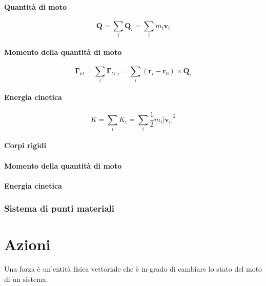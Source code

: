 \subsubsection{Quantità di moto}
\begin{equation}
    \mathbf{Q} = \sum_{i} \mathbf{Q}_i = \sum_i m_i \mathbf{v}_i
\end{equation}
\subsubsection{Momento della quantità di moto}
\begin{equation}
    \mathbf{\Gamma}_O = \sum_{i} \mathbf{\Gamma}_{O,i} = \sum_i \left( \mathbf{r}_i - \mathbf{r}_0 \right) \times \mathbf{Q}_i
\end{equation}
\subsubsection{Energia cinetica}
\begin{equation}
    K = \sum_i K_i = \sum_i \dfrac{1}{2} m_i | \mathbf{v}_i |^2
\end{equation}

\subsubsection{Corpi rigidi}
\subsubsection{Momento della quantità di moto}
\subsubsection{Energia cinetica}

\subsection{Sistema di punti materiali}

\chapter{Azioni}
\begin{definition}[Forza] Una forza è un'entità fisica vettoriale che è in grado di cambiare lo stato del moto di un sistema.
\end{definition}

